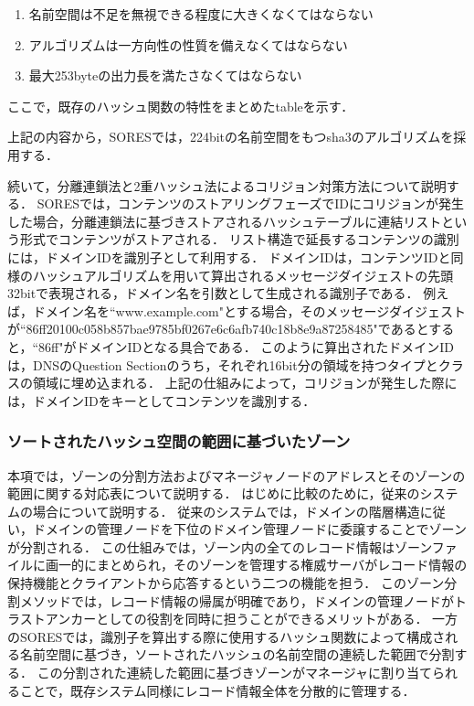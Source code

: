 \begin{enumerate}
 \item 名前空間は不足を無視できる程度に大きくなくてはならない
 \vspace{-3mm}
 \item アルゴリズムは一方向性の性質を備えなくてはならない
 \vspace{-3mm}
 \item 最大253byteの出力長を満たさなくてはならない
 \vspace{-3mm}
\end{enumerate}

ここで，既存のハッシュ関数の特性をまとめたtableを示す．

上記の内容から，SORESでは，224bitの名前空間をもつsha3のアルゴリズムを採用する．

続いて，分離連鎖法と2重ハッシュ法によるコリジョン対策方法について説明する．
SORESでは，コンテンツのストアリングフェーズでIDにコリジョンが発生した場合，分離連鎖法に基づきストアされるハッシュテーブルに連結リストという形式でコンテンツがストアされる．
リスト構造で延長するコンテンツの識別には，ドメインIDを識別子として利用する．
ドメインIDは，コンテンツIDと同様のハッシュアルゴリズムを用いて算出されるメッセージダイジェストの先頭32bitで表現される，ドメイン名を引数として生成される識別子である．
例えば，ドメイン名を``www.example.com"とする場合，そのメッセージダイジェストが``86ff20100c058b857bae9785bf0267e6c6afb740c18b8e9a87258485"であるとすると，``86ff"がドメインIDとなる具合である．
このように算出されたドメインIDは，DNSのQuestion Sectionのうち，それぞれ16bit分の領域を持つタイプとクラスの領域に埋め込まれる．
上記の仕組みによって，コリジョンが発生した際には，ドメインIDをキーとしてコンテンツを識別する．


\subsubsection{ソートされたハッシュ空間の範囲に基づいたゾーン}
本項では，ゾーンの分割方法およびマネージャノードのアドレスとそのゾーンの範囲に関する対応表について説明する．
はじめに比較のために，従来のシステムの場合について説明する．
従来のシステムでは，ドメインの階層構造に従い，ドメインの管理ノードを下位のドメイン管理ノードに委譲することでゾーンが分割される．
この仕組みでは，ゾーン内の全てのレコード情報はゾーンファイルに画一的にまとめられ，そのゾーンを管理する権威サーバがレコード情報の保持機能とクライアントから応答するという二つの機能を担う．
このゾーン分割メソッドでは，レコード情報の帰属が明確であり，ドメインの管理ノードがトラストアンカーとしての役割を同時に担うことができるメリットがある．
一方のSORESでは，識別子を算出する際に使用するハッシュ関数によって構成される名前空間に基づき，ソートされたハッシュの名前空間の連続した範囲で分割する．
この分割された連続した範囲に基づきゾーンがマネージャに割り当てられることで，既存システム同様にレコード情報全体を分散的に管理する．

